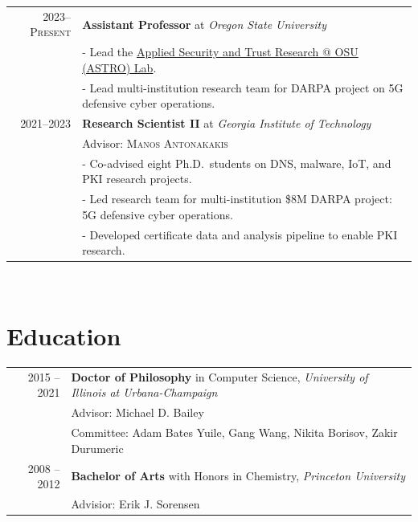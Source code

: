 \documentclass[10pt,singlecolumn]{article} %
\begin{document}
\begin{tabular}{rl}

2023--\textsc{Present} & \textbf{Assistant Professor} at \emph{Oregon State University}\\ 
	& - Lead the \href{https://astrolab.site}{Applied Security and Trust Research @ OSU (ASTRO) Lab}. \\
	& - Lead multi-institution research team for DARPA project on 5G defensive cyber operations.\\

2021--\textsc{2023} & \textbf{Research Scientist II} at \emph{Georgia Institute of Technology}\\ 
& Advisor: \textsc{Manos Antonakakis} \\
& - Co-advised eight Ph.D.\ students on DNS, malware, IoT, and PKI research projects. \\
& - Led research team for multi-institution \$8M DARPA project: 5G defensive cyber operations. \\
& - Developed certificate data and analysis pipeline to enable PKI research. \\
\end{tabular}\\




\section{Education} 

\begin{tabular}{rl} %


2015 -- 2021 & \textbf{Doctor of Philosophy} in Computer Science, \emph{University of Illinois at Urbana-Champaign}\\ 
& Advisor: Michael D. Bailey \\
& Committee: Adam Bates Yuile, Gang Wang, Nikita Borisov, Zakir Durumeric \\
	 

2008 -- 2012 & \textbf{Bachelor of Arts} with Honors in Chemistry,  \emph{Princeton University}\\
& Advisior: Erik J. Sorensen \\
	  
\end{tabular} \\
\end{document}
